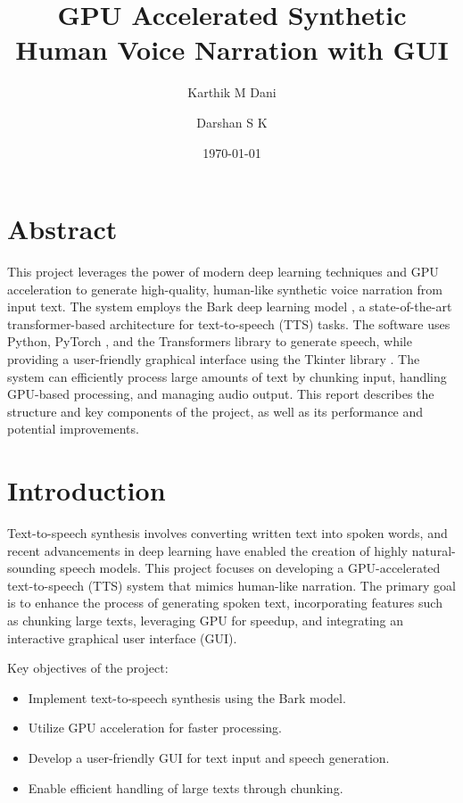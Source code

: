 \documentclass[12pt, a4paper]{article}
\title{
    \textbf{GPU Accelerated Synthetic Human Voice Narration with GUI}
}
\author{Karthik M Dani \and Darshan S K}
\date{\today}
\begin{document}
\maketitle
\tableofcontents
\newpage

\section{Abstract}

This project leverages the power of modern deep learning techniques \cite{arxivAttentionNeed} and GPU acceleration to generate high-quality, human-like synthetic voice narration from input text. The system employs the Bark deep learning model \cite{huggingfaceSunobarksmallHugging}, a state-of-the-art transformer-based architecture for text-to-speech (TTS) tasks. The software uses Python, PyTorch \cite{NEURIPS2019_bdbca288}, and the Transformers library to generate speech, while providing a user-friendly graphical interface using the Tkinter library \cite{lundh1999introduction}. The system can efficiently process large amounts of text by chunking input, handling GPU-based processing, and managing audio output. This report describes the structure and key components of the project, as well as its performance and potential improvements.

\section{Introduction}

Text-to-speech synthesis involves converting written text into spoken words, and recent advancements in deep learning have enabled the creation of highly natural-sounding speech models. This project focuses on developing a GPU-accelerated text-to-speech (TTS) system that mimics human-like narration. The primary goal is to enhance the process of generating spoken text, incorporating features such as chunking large texts, leveraging GPU for speedup, and integrating an interactive graphical user interface (GUI).

Key objectives of the project:

\begin{itemize}

\item Implement text-to-speech synthesis using the Bark model.

\item Utilize GPU acceleration for faster processing.

\item Develop a user-friendly GUI for text input and speech generation.

\item Enable efficient handling of large texts through chunking.

\end{itemize}
\end{document}
